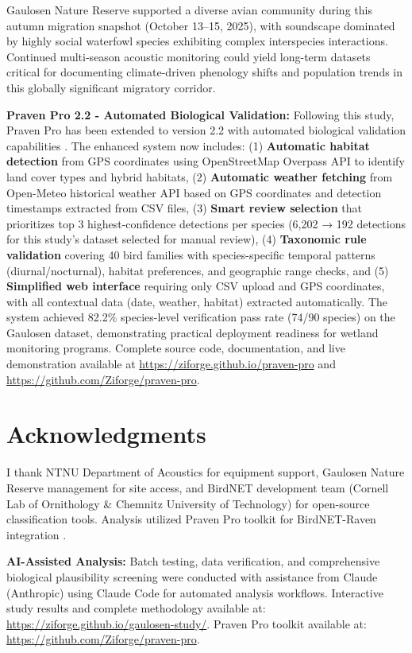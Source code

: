 \documentclass[twocolumn]{article}
\begin{document}
Gaulosen Nature Reserve supported a diverse avian community during this autumn migration snapshot (October 13--15, 2025), with soundscape dominated by highly social waterfowl species exhibiting complex interspecies interactions. Continued multi-season acoustic monitoring could yield long-term datasets critical for documenting climate-driven phenology shifts and population trends in this globally significant migratory corridor.

\textbf{Praven Pro 2.2 - Automated Biological Validation:} Following this study, Praven Pro has been extended to version 2.2 with automated biological validation capabilities \citep{Redpath2025}. The enhanced system now includes: (1) \textbf{Automatic habitat detection} from GPS coordinates using OpenStreetMap Overpass API to identify land cover types and hybrid habitats, (2) \textbf{Automatic weather fetching} from Open-Meteo historical weather API based on GPS coordinates and detection timestamps extracted from CSV files, (3) \textbf{Smart review selection} that prioritizes top 3 highest-confidence detections per species (6,202 → 192 detections for this study's dataset selected for manual review), (4) \textbf{Taxonomic rule validation} covering 40 bird families with species-specific temporal patterns (diurnal/nocturnal), habitat preferences, and geographic range checks, and (5) \textbf{Simplified web interface} requiring only CSV upload and GPS coordinates, with all contextual data (date, weather, habitat) extracted automatically. The system achieved 82.2\% species-level verification pass rate (74/90 species) on the Gaulosen dataset, demonstrating practical deployment readiness for wetland monitoring programs. Complete source code, documentation, and live demonstration available at \url{https://ziforge.github.io/praven-pro} and \url{https://github.com/Ziforge/praven-pro}.

\section*{Acknowledgments}

I thank NTNU Department of Acoustics for equipment support, Gaulosen Nature Reserve management for site access, and BirdNET development team (Cornell Lab of Ornithology \& Chemnitz University of Technology) for open-source classification tools. Analysis utilized Praven Pro toolkit for BirdNET-Raven integration \citep{Redpath2025}.

\textbf{AI-Assisted Analysis:} Batch testing, data verification, and comprehensive biological plausibility screening were conducted with assistance from Claude (Anthropic) using Claude Code for automated analysis workflows. Interactive study results and complete methodology available at: \url{https://ziforge.github.io/gaulosen-study/}. Praven Pro toolkit available at: \url{https://github.com/Ziforge/praven-pro}.
\end{document}
